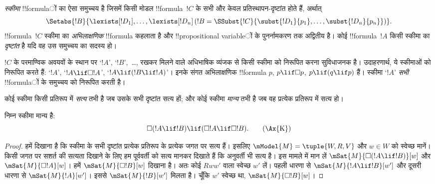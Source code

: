 \documentclass[../../../include/open-logic-section]{subfiles}
\begin{document}


\begin{defn}
  \emph{स्कीमा} !!{formula}ों का ऐसा समुच्चय है जिसमें किसी मोडल
  !!{formula}~$!C$ के सभी और केवल प्रतिस्थापन-दृष्टांत होते हैं, अर्थात्
  \[
  \Setabs{!B}{\lexists[!D_1], \dots, \lexists[!D_n] \left(!B =
  \SSubst{!C}{\subst{!D_1}{p_1}, \dots, \subst{!D_n}{p_n}} \right) }.
  \]
  !!{formula}~$!C$ स्कीमा का \emph{अभिलाक्षणिक} !!{formula} कहलाता है और
  !!{propositional variable}ों के पुनर्नामकरण तक अद्वितीय है। कोई !!{formula}~$!A$
  किसी स्कीमा का \emph{दृष्टांत} है यदि वह उस समुच्चय का सदस्य हो।
\end{defn}

$!C$ के परमाण्विक अवयवों के स्थान पर `$!A$', `$!B$',~\dots, रखकर मिलने
वाले अधिभाषिक व्यंजक से किसी स्कीमा को निरूपित करना सुविधाजनक है।
उदाहरणार्थ, ये स्कीमाओं को निरूपित करते हैं: `$!A$',
`$!A \lif \Box!A$', `$!A \lif (!B \lif !A)$'। इनके संगत अभिलाक्षणिक
!!{formula} $p$, $p \lif \Box p$, $p \lif (q \lif p)$ हैं। स्कीमा `$!A$'
\emph{सभी} !!{formula}ों के समुच्चय को निरूपित करती है।

\begin{defn}
  कोई स्कीमा किसी प्रतिरूप में \emph{सत्य} तभी है जब उसके सभी दृष्टांत सत्य
  हों; और कोई स्कीमा \emph{मान्य} तभी है जब वह प्रत्येक प्रतिरूप में सत्य हो।
\end{defn}

\begin{prop}
  निम्न स्कीमा  मान्य है:
  \begin{equation*}
  \Box(!A \lif !B) \lif (\Box !A \lif \Box !B). \tag{\Ax{K}}
  \end{equation*}
\end{prop}

\begin{proof}
  हमें दिखाना है कि स्कीमा के सभी दृष्टांत प्रत्येक प्रतिरूप के प्रत्येक
  जगत पर सत्य हैं। इसलिए $\mModel{M} = \tuple{W,R,V}$ और $w \in W$ को
  स्वेच्छ मानें। किसी जगत पर सशर्त की सत्यता दिखाने के लिए हम पूर्ववर्ती को
  सत्य मानकर दिखाते हैं कि अनुवर्ती भी सत्य है। इस मामले में मान लें
  $\mSat{M}{\Box(!A \lif !B)}[w]$ और $\mSat{M}{\Box !A}[w]$। हमें
  $\mSat{M}{\Box !B}[w]$ दिखाना है। अतः कोई $Rww'$ वाला स्वेच्छ $w'$ लें।
  पहली धारणा से $\mSat{M}{!A \lif !B}[w']$ और दूसरी धारणा से
  $\mSat{M}{!A}[w']$। इससे $\mSat{M}{!B}[w']$ मिलता है। चूँकि $w'$ स्वेच्छ
  था, $\mSat{M}{\Box !B}[w]$।
\end{proof}
\end{document}
